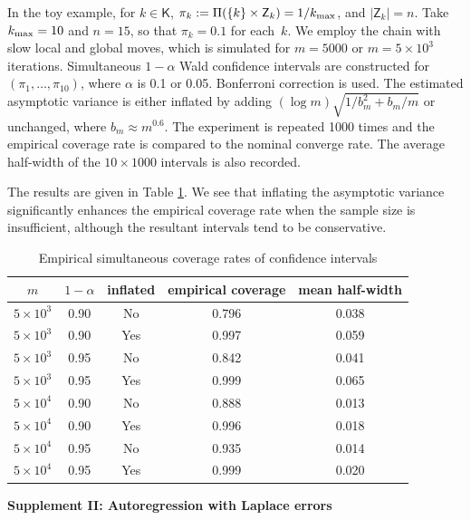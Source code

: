 \documentclass[12pt]{article}
\newcommand{\Z}{\mathsf{Z}}
\begin{document}
In the toy example, for $k \in \mathsf{K}$, $\pi_k := \Pi(\{k\} \times \Z_k) = 1/k_{\scriptsize\mbox{max}}$, and $|\Z_k| = n$.
Take $k_{\scriptsize\mbox{max}} = 10$ and $n = 15$, so that $\pi_k = 0.1$ for each~$k$.
We employ the chain with slow local and global moves, which is simulated for $m=5000$ or $m = 5 \times 10^3$ iterations.
Simultaneous $1-\alpha$ Wald confidence intervals are constructed for $(\pi_1, \dots, \pi_{10})$, where $\alpha$ is 0.1 or 0.05.
Bonferroni correction is used.
The estimated asymptotic variance is either inflated by adding $(\log m) \sqrt{1/b_m^2 + b_m/m}$ or unchanged, where $b_m \approx m^{0.6}$.
The experiment is repeated 1000 times and the empirical coverage rate is compared to the nominal converge rate.
The average half-width of the $10 \times 1000$ intervals is also recorded.

The results are given in Table \ref{tab:wald}.
We see that inflating the asymptotic variance significantly enhances the empirical coverage rate when the sample size is insufficient, although the resultant intervals tend to be conservative.


\begin{table} \caption{Empirical simultaneous coverage rates of confidence intervals}\label{tab:wald}
	\centering
	\begin{tabular}{ccccc}
		\hline
		$m$ & $1-\alpha$ & inflated & empirical coverage & mean half-width \\
		\hline
		$5 \times 10^3$  & 0.90 & No & 0.796 & 0.038 \\
		$5 \times 10^3$  & 0.90 & Yes & 0.997 & 0.059 \\
		$5 \times 10^3$  & 0.95 & No & 0.842 & 0.041 \\
		$5 \times 10^3$  & 0.95 & Yes & 0.999 & 0.065 \\
		$5 \times 10^4$  & 0.90 & No & 0.888 & 0.013 \\
		$5 \times 10^4$  & 0.90 & Yes & 0.996 & 0.018 \\
		$5 \times 10^4$  & 0.95 & No & 0.935 & 0.014 \\
		$5 \times 10^4$  & 0.95 & Yes & 0.999 & 0.020 \\
		\hline
	\end{tabular}
\end{table}


\newpage

\begin{center} 
	{\bf \LARGE Supplement II: Autoregression with Laplace errors}
\end{center}
\end{document}
